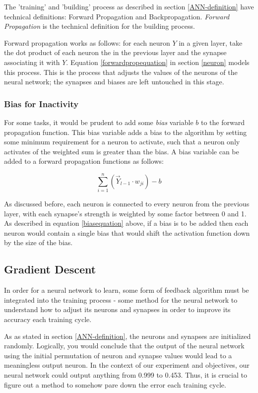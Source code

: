 \documentclass[12pt]{article}
\begin{document}
The 'training' and 'building' process as described in section \ref{ANN-definition} have technical definitions: Forward Propagation and Backpropagation. \textit{Forward Propagation} is the technical definition for the building process.

Forward propagation works as follows: for each neuron \(Y\) in a given layer, take the dot product of each neuron the in the previous layer and the synapse associating it with \(Y\). Equation \ref{forwardpropequation} in section \ref{neuron} models this process. This is the process that adjusts the values of the neurons of the neural network; the synapses and biases are left untouched in this stage.

\subsubsection{Bias for Inactivity}
For some tasks, it would be prudent to add some \textit{bias} variable \(b\) to the forward propagation function. This bias variable adds a bias to the algorithm by setting some minimum requirement for a neuron to activate, such that a neuron only activates of the weighted sum is greater than the bias. A bias variable can be added to a forward propagation functions as follows:

\begin{equation} \label{biasequation}
  \sum_{i=1}^{n}(\vec Y_{l-1} \cdot w_{ji}) -b
\end{equation}

As discussed before, each neuron is connected to every neuron from the previous layer, with each synapse's strength is weighted by some factor between 0 and 1. As described in equation \ref{biasequation} above, if a bias is to be added then each neuron would contain a single bias that would shift the activation function down by the size of the bias.


\subsection{Gradient Descent \label{gradient-descent}}

In order for a neural network to learn, some form of feedback algorithm must be integrated into the training process - some method for the neural network to understand how to adjust its neurons and synapses in order to improve its accuracy each training cycle.

As as stated in section \ref{ANN-definition}, the neurons and synapses are initialized randomly. Logically, you would conclude that the output of the neural network using the initial permutation of neuron and synapse values would lead to a meaningless output neuron. In the context of our experiment and objectives, our neural network could output anything from 0.999 to 0.453. Thus, it is crucial to figure out a method to somehow pare down the error each training cycle.
\end{document}
